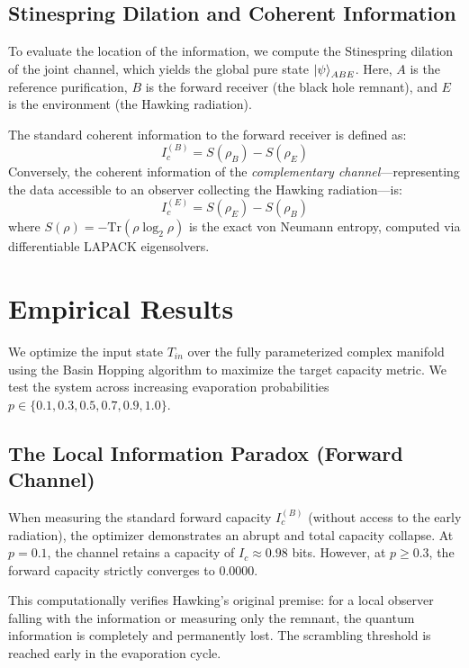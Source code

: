 \documentclass[twocolumn,prl,aps,floatfix]{revtex4-2}
\begin{document}
\subsection{Stinespring Dilation and Coherent Information}
To evaluate the location of the information, we compute the Stinespring dilation of the joint channel, which yields the global pure state $\ket{\psi}_{ABE}$. Here, $A$ is the reference purification, $B$ is the forward receiver (the black hole remnant), and $E$ is the environment (the Hawking radiation).

The standard coherent information to the forward receiver is defined as:
\begin{equation}
    I_c^{(B)} = S(\rho_B) - S(\rho_E)
\end{equation}
Conversely, the coherent information of the \emph{complementary channel}---representing the data accessible to an observer collecting the Hawking radiation---is:
\begin{equation}
    I_c^{(E)} = S(\rho_E) - S(\rho_B)
\end{equation}
where $S(\rho) = -\text{Tr}(\rho \log_2 \rho)$ is the exact von Neumann entropy, computed via differentiable LAPACK eigensolvers.

\section{Empirical Results}

We optimize the input state $T_{in}$ over the fully parameterized complex manifold using the Basin Hopping algorithm to maximize the target capacity metric. We test the system across increasing evaporation probabilities $p \in \{0.1, 0.3, 0.5, 0.7, 0.9, 1.0\}$.

\subsection{The Local Information Paradox (Forward Channel)}
When measuring the standard forward capacity $I_c^{(B)}$ (without access to the early radiation), the optimizer demonstrates an abrupt and total capacity collapse.
At $p=0.1$, the channel retains a capacity of $I_c \approx 0.98$ bits. However, at $p \ge 0.3$, the forward capacity strictly converges to $0.0000$. 

This computationally verifies Hawking's original premise: for a local observer falling with the information or measuring only the remnant, the quantum information is completely and permanently lost. The scrambling threshold is reached early in the evaporation cycle.
\end{document}
